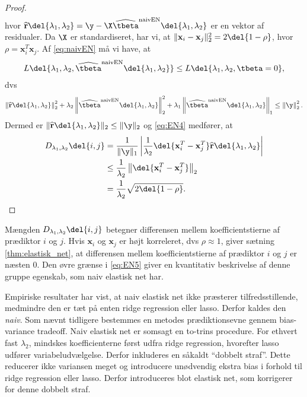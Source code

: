 \begin{proof}
\begin{align}
\end{align}
hvor \(\widehat{\mathbf{r}}\del{\lambda_1, \lambda_2} = \y - \X  \widehat{\tbeta}^\text{naivEN} \del{\lambda_1, \lambda_2}\) er en vektor af residualer.
Da \(\X\) er standardiseret, har vi, at \(\Vert \mathbf{x}_i - \mathbf{x}_j \Vert_2^2=2 \del{1-\rho}\), hvor \(\rho = \mathbf{x}_i^T \mathbf{x}_j\).
Af \eqref{eq:naivEN} må vi have, at
\begin{align*}
L \del{\lambda_1,\lambda_2, \widehat{\tbeta}^\text{naivEN} \del{\lambda_1, \lambda_2}} \leq L \del{\lambda_1,\lambda_2, \tbeta = 0},  
\end{align*}
dvs
\begin{align*}
\left\Vert \widehat{\mathbf{r}} \del{\lambda_1, \lambda_2} \right\Vert_2^2 + \lambda_2 \left\Vert \widehat{\tbeta}^\text{naivEN} \del{\lambda_1, \lambda_2} \right\Vert_2^2 + \lambda_1 \left\Vert \widehat{\tbeta}^\text{naivEN} \del{\lambda_1, \lambda_2} \right\Vert_1 \leq \left\Vert \y \right\Vert_2^2.  
\end{align*}
Dermed er \(\Vert \widehat{\mathbf{r}} \del{\lambda_1, \lambda_2} \Vert_2 \leq \Vert \y \Vert_2\) og \eqref{eq:EN4} medfører, at
\begin{align*}
D_{\lambda_1, \lambda_2} \del{i,j} &= \frac{1}{\Vert \y \Vert_1} \left\vert \frac{1}{\lambda_2} \del{\mathbf{x}_i^T-\mathbf{x}_j^T} \widehat{\mathbf{r}}\del{\lambda_1, \lambda_2} \right\vert \\ 
&\leq \frac{1}{\lambda_2} \left\Vert \del{\mathbf{x}_i^T-\mathbf{x}_j^T} \right\Vert_2 \\ 
&= \frac{1}{\lambda_2} \sqrt{2 \del{1-\rho}}.
\end{align*}
\end{proof}
%
Mængden \(D_{\lambda_1, \lambda_2} \del{i,j}\) betegner differensen mellem koefficientstierne af prædiktor \(i\) og \(j\).
Hvis \(\mathbf{x}_i\) og \(\mathbf{x}_j\) er højt korreleret, dvs \(\rho \approx 1\), giver sætning \ref{thm:elastisk_net}, at differensen mellem koefficientstierne af prædiktor \(i\) og \(j\) er næsten 0.
Den øvre grænse i \eqref{eq:EN5} giver en kvantitativ beskrivelse af denne gruppe egenskab, som naiv elastisk net har.

Empiriske resultater har vist, at naiv elastisk net ikke præsterer tilfredsstillende, medmindre den er tæt på enten ridge regression eller lasso.
Derfor kaldes den \textit{naiv}.
Som nævnt tidligere bestemmes en metodes prædiktionsevne gennem bias-variance tradeoff. 
Naiv elastisk net er somsagt en to-trins procedure. 
For ethvert fast \(\lambda_2\), mindskes koefficienterne først udfra ridge regression, hvorefter lasso udfører variabeludvælgelse.
Derfor inkluderes en såkaldt ``dobbelt straf''.
Dette reducerer ikke variansen meget og introducere unødvendig ekstra bias i forhold til ridge regression eller lasso.
Derfor introduceres blot elastisk net, som korrigerer for denne dobbelt straf.

